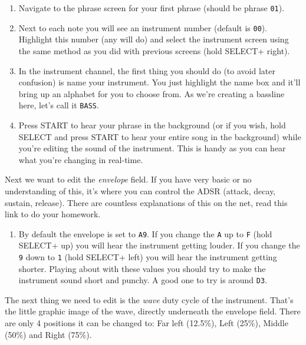 \documentclass[]{article}
\newcommand{\buttonStyle}[1]{\textsf{#1}\xspace}
\newcommand{\bStart}{\buttonStyle{{START}}}
\newcommand{\bSelect}{\buttonStyle{{SELECT}}}
\newcommand{\bRight}{\buttonStyle{right}}
\newcommand{\bLeft}{\buttonStyle{left}}
\newcommand{\bUp}{\buttonStyle{up}}
\newcommand{\gbtxt}[1]{\texttt{#1}\xspace}
\begin{document}
\begin{enumerate}
	
\item Navigate to the phrase screen for your first phrase (should be phrase \gbtxt{01}).

\item Next to each note you will see an instrument number (default is \gbtxt{00}). Highlight this number (any will do) and select the instrument screen using the same method as you did with previous screens (hold \bSelect + \bRight).

\item In the instrument channel, the first thing you should do (to avoid later confusion) is name your instrument. You just highlight the name box and it'll bring up an alphabet for you to choose from. As we're creating a bassline here, let's call it \gbtxt{BASS}.

\item Press \bStart to hear your phrase in the background (or if you wish, hold \bSelect and press \bStart to hear your entire song in the background) while you're editing the sound of the instrument. This is handy as you can hear what you're changing in real-time.

\end{enumerate}

Next we want to edit the \textit{envelope} field. If you have very basic or no understanding of this, it's where you can control the ADSR (attack, decay, sustain, release). There are countless explanations of this on the net, read this link to do your homework.

\begin{enumerate}[resume]

\item By default the envelope is set to \gbtxt{A9}. If you change the \gbtxt{A} up to \gbtxt{F} (hold \bSelect + \bUp) you will hear the instrument getting louder. If you change the \gbtxt{9} down to \gbtxt{1} (hold \bSelect + \bLeft) you will hear the instrument getting shorter. Playing about with these values you should try to make the instrument sound short and punchy. A good one to try is around \gbtxt{D3}.

\end{enumerate}

The next thing we need to edit is the \textit{wave} duty cycle of the instrument. That's the little graphic image of the wave, directly underneath the envelope field. There are only 4 positions it can be changed to: Far left (12.5\%), Left (25\%), Middle (50\%) and Right (75\%). 
\end{document}

